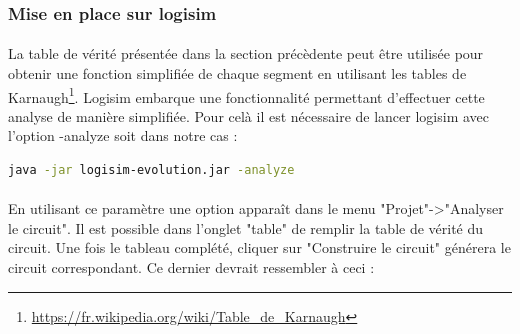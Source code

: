 \subsubsection{Mise en place sur logisim}
\paragraph{}
La table de vérité présentée dans la section précèdente peut être utilisée pour obtenir une fonction simplifiée de chaque segment en utilisant les tables de Karnaugh\footnote{\url{https://fr.wikipedia.org/wiki/Table_de_Karnaugh}}. Logisim embarque une fonctionnalité permettant d'effectuer cette analyse de manière simplifiée. Pour celà il est nécessaire de lancer logisim avec l'option -analyze soit dans notre cas :

\begin{lstlisting}[language=bash]
java -jar logisim-evolution.jar -analyze
\end{lstlisting}

\paragraph{}
En utilisant ce paramètre une option apparaît dans le menu "Projet"->"Analyser le circuit". Il est possible dans l'onglet "table" de remplir la table de vérité du circuit. Une fois le tableau complété, cliquer sur "Construire le circuit" générera le circuit correspondant. Ce dernier devrait ressembler à ceci :

